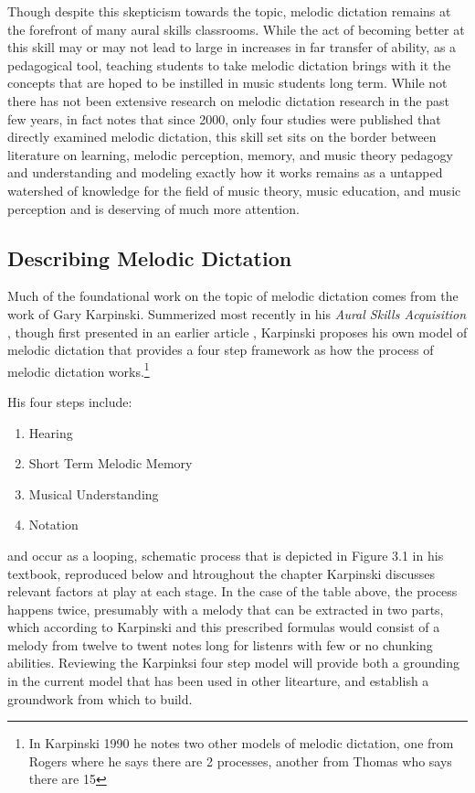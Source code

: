 \documentclass[]{book}
\providecommand{\tightlist}{%
  \setlength{\itemsep}{0pt}\setlength{\parskip}{0pt}}
\let\rmarkdownfootnote\footnote%
\def\footnote{\protect\rmarkdownfootnote}
\theoremstyle{definition}
\theoremstyle{definition}
\theoremstyle{definition}
\theoremstyle{remark}
\begin{document}
Though despite this skepticism towards the topic, melodic dictation
remains at the forefront of many aural skills classrooms. While the act
of becoming better at this skill may or may not lead to large in
increases in far transfer of ability, as a pedagogical tool, teaching
students to take melodic dictation brings with it the concepts that are
hoped to be instilled in music students long term. While not there has
not been extensive research on melodic dictation research in the past
few years, in fact \citep{paneyEffectDirectingAttention2016} notes that
since 2000, only four studies were published that directly examined
melodic dictation, this skill set sits on the border between literature
on learning, melodic perception, memory, and music theory pedagogy and
understanding and modeling exactly how it works remains as a untapped
watershed of knowledge for the field of music theory, music education,
and music perception and is deserving of much more attention.

\hypertarget{describing-melodic-dictation}{%
\subsection{Describing Melodic
Dictation}\label{describing-melodic-dictation}}

Much of the foundational work on the topic of melodic dictation comes
from the work of Gary Karpinski. Summerized most recently in his
\emph{Aural Skills Acquisition}
\citep{karpinskiAuralSkillsAcquisition2000}, though first presented in
an earlier article \citep{karpinskiModelMusicPerception1990}, Karpinski
proposes his own model of melodic dictation that provides a four step
framework as how the process of melodic dictation works.\footnote{In
  Karpinski 1990 he notes two other models of melodic dictation, one
  from Rogers where he says there are 2 processes, another from Thomas
  who says there are 15}

His four steps include:

\begin{enumerate}
\def\labelenumi{\arabic{enumi}.}
\tightlist
\item
  Hearing
\item
  Short Term Melodic Memory
\item
  Musical Understanding
\item
  Notation
\end{enumerate}

and occur as a looping, schematic process that is depicted in Figure 3.1
in his textbook, reproduced below and htroughout the chapter Karpinski
discusses relevant factors at play at each stage. In the case of the
table above, the process happens twice, presumably with a melody that
can be extracted in two parts, which according to Karpinski and this
prescribed formulas would consist of a melody from twelve to twent notes
long for listenrs with few or no chunking abilities. Reviewing the
Karpinksi four step model will provide both a grounding in the current
model that has been used in other litearture, and establish a groundwork
from which to build.
\end{document}
